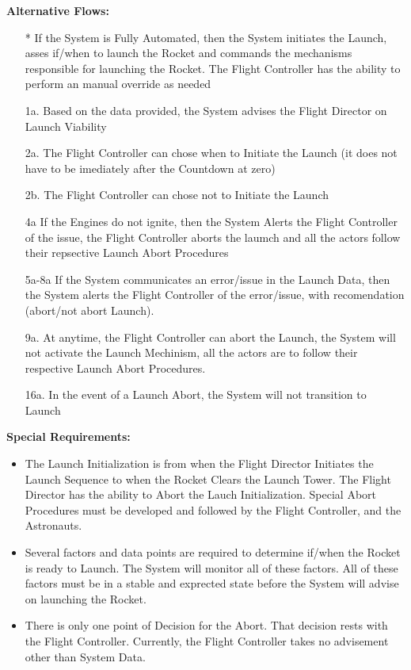 \documentclass[letterpaper]{article}
\begin{document}
\textbf{Alternative Flows:}
\begin{itemize}
\item[*]  If the System is Fully Automated, then the System initiates
the Launch, asses if/when to launch the Rocket and commands the
mechanisms responsible for launching the Rocket.  The Flight Controller
has the ability to perform an manual override as needed
\item[1a.]Based on the data provided, the System advises the Flight
Director on Launch Viability
\item[2a.]The Flight Controller can chose when to Initiate the Launch 
(it
does not have to be imediately after the Countdown at zero)
\item[2b.]The Flight Controller can chose not to Initiate the Launch
\item[4a]If the Engines do not ignite, then the System Alerts the
Flight Controller of the issue, the Flight Controller aborts the
laumch and all the actors follow their repsective Launch Abort
Procedures
\item[5a-8a]If the System communicates an error/issue in the Launch
Data, then the System alerts the Flight Controller of the error/issue,
with recomendation (abort/not abort Launch).
\item[9a.]At anytime, the Flight Controller can abort the Launch, the
System will not activate the Launch Mechinism, all the actors are to
follow their respective Launch Abort Procedures.
\item[16a.]In the event of a Launch Abort, the System will not
transition to Launch
\end{itemize}
\textbf{Special Requirements:}
\begin{itemize}
\item The Launch Initialization is from when the Flight Director
Initiates the Launch Sequence to when the Rocket Clears the Launch
Tower.  The Flight Director has the ability to Abort the Lauch
Initialization.  Special Abort Procedures must be developed and
followed by the Flight Controller, and the Astronauts.
\item Several factors and data points are required to determine
if/when the Rocket is ready to Launch.  The System will monitor all
of these factors.  All of these factors must be in a stable and
exprected state before the System will advise on launching the Rocket.
\item There is only one point of Decision for the Abort.  That decision
rests with the Flight Controller.  Currently, the Flight Controller
takes no advisement other than System Data.
\end{itemize}
\end{document}
